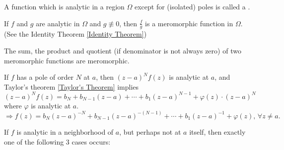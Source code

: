 \begin{definition}
    A function which is analytic in a region $ \Omega $ except for (isolated) poles is called a .
\end{definition}
\begin{example}
    If  $ f $ and  $ g $ are analytic in  $ \Omega $ and  $ g\not\equiv 0 $, then  $ \frac{f}{g} $ is a meromorphic function in  $ \Omega $. (See the Identity Theorem \ref{Identity Theorem})
\end{example}
\begin{remark}
    The sum, the product and quotient (if denominator is not always zero) of two meromorphic functions are meromorphic.
\end{remark}
If  $ f $ has a pole of order  $ N $ at  $ a $, then  $ (z-a)^Nf(z) $ is analytic at  $ a $, and Taylor's theorem \ref{Taylor's Theorem} implies 
\begin{equation}
    (z-a)^Nf(z)=b_N+b_{N-1}(z-a)+\cdots+b_1(z-a)^{N-1}+\varphi(z)\cdot(z-a)^N
\end{equation}
where  $ \varphi $ is analytic at  $ a $.
\begin{equation}
    \Rightarrow  f(z)=b_N(z-a)^{-N}+b_{N-1}(z-a)^{-(N-1)}+\cdots+b_1(z-a)^{-1}+\varphi(z),\,\forall z\neq a . 
\end{equation} 
\begin{theorem}\label{thm:4.3.2:Classification of isolated singularities}
    If  $ f $ is analytic in a neighborhood of  $ a $, but perhaps not at  $ a $ itself, then exactly one of the following  $ 3 $ cases occurs:
\end{theorem} 